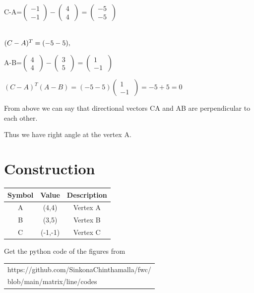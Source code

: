 \documentclass[journal,12pt,twocolumn]{IEEEtran}
\begin{document}
\vspace{0.5cm}\raggedright
C-A=$\begin{pmatrix}
-1 \\
-1 
\end{pmatrix}
-\begin{pmatrix}
4 \\
4 \
\end{pmatrix}
=\begin{pmatrix}
-5 \\
-5 \
\end{pmatrix}$
\vspace{0.5cm}\raggedright\\
$(C-A)^T=(-5\space -5),$
\vspace{0.5cm}\raggedright
A-B=$\begin{pmatrix}
4 \\
4 \ 
\end{pmatrix}
-\begin{pmatrix}
3 \\
5 \
\end{pmatrix}
=\begin{pmatrix}
1 \\
-1 \
\end{pmatrix}$
\vspace{0.25cm}\raggedright
$(C-A)^T(A-B)=(-5 -5)\begin{pmatrix}
1 \\
-1 \
\end{pmatrix}
=-5+5=0$
\vspace{0.25cm}\raggedright
From above we can say that directional vectors CA and AB are perpendicular to each other.\\
\vspace{0.25cm}\raggedright
Thus we have right angle at the vertex A.


\vspace{0.2cm}
\section*{Construction}
\centering
\vspace{0.2cm}
{
\setlength\extrarowheight{2pt}
\begin{tabular}{|c|c|c|}
	\hline
	\textbf{Symbol}&\textbf{Value}&\textbf{Description}\\
	\hline
	A & (4,4) & Vertex A\\
	\hline
	B & (3,5) & Vertex B\\
	\hline
	C & (-1,-1) & Vertex C\\
	\hline
	
\end{tabular}
}

\vspace{0.6cm}
Get the python code of the figures from
\begin{table}[h]
\large
\centering
\begin{tabular}{|l|}
\hline
https://github.com/SinkonaChinthamalla/fwc/
\\blob/main/matrix/line/codes \\
\hline
\end{tabular}

\end{table}
\end{document}
